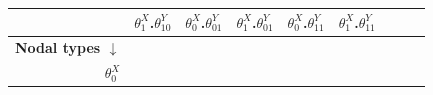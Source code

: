 \documentclass[
  12pt,
]{book}
\begin{document}
\begin{longtable}[]{@{}rcccccccc@{}}
\begin{minipage}[b]{0.08\columnwidth}
\end{minipage} & \begin{minipage}[b]{0.08\columnwidth}\centering
\(\theta^X_1\).\(\theta^Y_{10}\)\strut
\end{minipage} & \begin{minipage}[b]{0.08\columnwidth}\centering
\(\theta^X_0\).\(\theta^Y_{01}\)\strut
\end{minipage} & \begin{minipage}[b]{0.08\columnwidth}\centering
\(\theta^X_1\).\(\theta^Y_{01}\)\strut
\end{minipage} & \begin{minipage}[b]{0.08\columnwidth}\centering
\(\theta^X_0\).\(\theta^Y_{11}\)\strut
\end{minipage} & \begin{minipage}[b]{0.08\columnwidth}\centering
\(\theta^X_1\).\(\theta^Y_{11}\)\strut
\end{minipage}\tabularnewline
\midrule
\endhead
\begin{minipage}[t]{0.12\columnwidth}\raggedleft
\textbf{Nodal types \(\downarrow\)}\strut
\end{minipage} & \begin{minipage}[t]{0.08\columnwidth}\centering
\strut
\end{minipage} & \begin{minipage}[t]{0.08\columnwidth}\centering
\strut
\end{minipage} & \begin{minipage}[t]{0.08\columnwidth}\centering
\strut
\end{minipage} & \begin{minipage}[t]{0.08\columnwidth}\centering
\strut
\end{minipage} & \begin{minipage}[t]{0.08\columnwidth}\centering
\strut
\end{minipage} & \begin{minipage}[t]{0.08\columnwidth}\centering
\strut
\end{minipage} & \begin{minipage}[t]{0.08\columnwidth}\centering
\strut
\end{minipage} & \begin{minipage}[t]{0.08\columnwidth}\centering
\strut
\end{minipage}\tabularnewline
\begin{minipage}[t]{0.12\columnwidth}\raggedleft
\(\theta^X_0\)\strut
\end{minipage} & \begin{minipage}[t]{0.08\columnwidth}\centering

\end{minipage}
\end{longtable}
\end{document}
